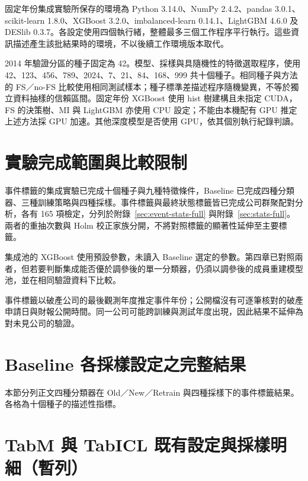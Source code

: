 

固定年份集成實驗所保存的環境為 Python 3.14.0、NumPy 2.4.2、pandas 3.0.1、scikit-learn 1.8.0、XGBoost 3.2.0、imbalanced-learn 0.14.1、LightGBM 4.6.0 及 DESlib 0.3.7。各設定使用四個執行緒，整體最多三個工作程序平行執行。這些資訊描述產生該批結果時的環境，不以後續工作環境版本取代。

2014 年驗證分區的種子固定為 42。模型、採樣與具隨機性的特徵選取程序，使用 42、123、456、789、2024、7、21、84、168、999 共十個種子。相同種子與方法的 FS／no-FS 比較使用相同測試樣本；種子標準差描述程序隨機變異，不等於獨立資料抽樣的信賴區間。固定年份 XGBoost 使用 hist 樹建構且未指定 CUDA，FS 的決策樹、MI 與 LightGBM 亦使用 CPU 設定；不能由本機配有 GPU 推定上述方法採 GPU 加速。其他深度模型是否使用 GPU，依其個別執行紀錄判讀。

\section{實驗完成範圍與比較限制}\label{sec:method-evidence}

事件標籤的集成實驗已完成十個種子與九種特徵條件，Baseline 已完成四種分類器、三種訓練策略與四種採樣。事件標籤與最終狀態標籤皆已完成公司群聚配對分析，各有 165 項檢定，分列於附錄~\ref{sec:event-stats-full} 與附錄~\ref{sec:stats-full}。兩者的重抽次數與 Holm 校正家族分開，不將對照標籤的顯著性延伸至主要標籤。

集成池的 XGBoost 使用預設參數，未讀入 Baseline 選定的參數。第四章已對照兩者，但若要判斷集成能否優於調參後的單一分類器，仍須以調參後的成員重建模型池，並在相同驗證資料下比較。

事件標籤以破產公司的最後觀測年度推定事件年份；公開檔沒有可逐筆核對的破產申請日與財報公開時間。同一公司可能跨訓練與測試年度出現，因此結果不延伸為對未見公司的驗證。

\clearpage
\section{Baseline 各採樣設定之完整結果}\label{sec:results-baseline-full}

本節分列正文四種分類器在 Old／New／Retrain 與四種採樣下的事件標籤結果。各格為十個種子的描述性指標。



\clearpage
\section{TabM 與 TabICL 既有設定與採樣明細（暫列）}\label{sec:deep-reference-details}

